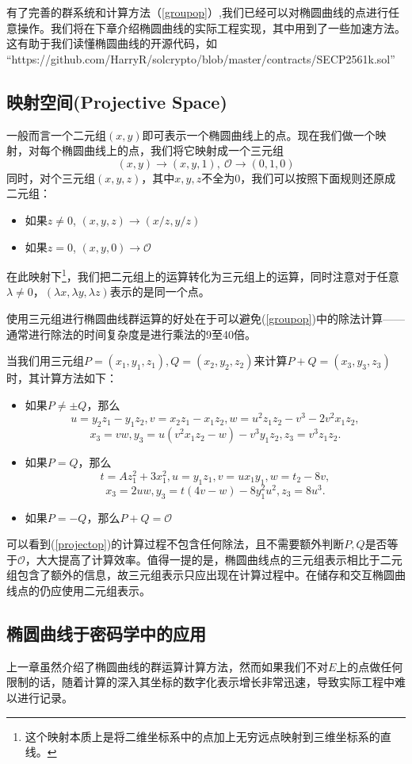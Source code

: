 \documentclass[12pt]{article}
\newcommand{\ec}{椭圆曲线}
\newcommand{\oo}{\mathcal{O}}
\begin{document}
有了完善的群系统和计算方法（\ref{groupop}）,我们已经可以对\ec 的点进行任意操作。我们将在下章介绍\ec 的实际工程实现，其中用到了一些加速方法。这有助于我们读懂\ec 的开源代码，如\\“https://github.com/HarryR/solcrypto/blob/master/contracts/SECP2561k.sol”
\subsection{映射空间(Projective Space)}
一般而言一个二元组$(x,y)$即可表示一个\ec 上的点。现在我们做一个映射，对每个\ec 上的点，我们将它映射成一个三元组
$$(x,y) \rightarrow (x,y,1), ~\oo \rightarrow (0,1,0)$$
同时，对个三元组$(x,y,z)$，其中$x,y,z$不全为0，我们可以按照下面规则还原成二元组：
\begin{itemize}
	\item 如果$z \neq 0 $, $(x,y,z) \rightarrow (x/z,y/z)$
	\item 如果$z = 0$, $(x,y,0) \rightarrow \oo$
\end{itemize}
在此映射下\footnote{这个映射本质上是将二维坐标系中的点加上无穷远点映射到三维坐标系的直线。}，我们把二元组上的运算转化为三元组上的运算，同时注意对于任意$\lambda \neq 0$，$(\lambda x, \lambda y, \lambda z)$表示的是同一个点。

使用三元组进行\ec 群运算的好处在于可以避免(\ref{groupop})中的除法计算——通常进行除法的时间复杂度是进行乘法的9至40倍。

当我们用三元组$P=(x_1,y_1,z_1),Q=(x_2,y_2,z_2)$来计算$P+Q=(x_3,y_3,z_3)$时，其计算方法如下：
\begin{itemize}
	\label{projectop}
	\item 如果$P \neq \pm Q$，那么
	$$	u = y_2z_1 −y_1z_2, v = x_2z_1 −x_1z_2, w = u^2z_1z_2 −v^3 −2v^2x_1z_2,$$
	$$x_3 = vw, y_3 = u(v^2x_1z_2 − w) − v^3y_1z_2, z_3 = v^3z_1z_2.$$
	\item 如果$P = Q$，那么
	$$ t=Az_1^2+3x_1^2, u=y_1z_1, v=ux_1y_1, w=t_2−8v,$$
	$$x_3 =2uw, y_3 =t(4v−w)−8y_1^2u^2, z_3 =8u^3.$$
	\item 如果$P = -Q$，那么$P+Q = \oo$
\end{itemize}
可以看到(\ref{projectop})的计算过程不包含任何除法，且不需要额外判断$P,Q$是否等于$\oo$，大大提高了计算效率。值得一提的是，\ec 点的三元组表示相比于二元组包含了额外的信息，故三元组表示只应出现在计算过程中。在储存和交互\ec 点的仍应使用二元组表示。
\subsection{\ec 于密码学中的应用}
上一章虽然介绍了椭圆曲线的群运算计算方法，然而如果我们不对$E$上的点做任何限制的话，随着计算的深入其坐标的数字化表示增长非常迅速，导致实际工程中难以进行记录。
\end{document}
